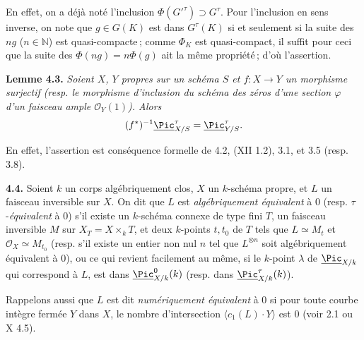 En
effet, on a d\'ej\`a not\'e l'inclusion \(\Phi(G'^\tau)\supset G^\tau\). Pour l'inclusion en sens inverse, on note que \(g\in G(K)\) est dans \(G^\tau(K)\) si et seulement si la suite des \(ng\) (\(n\in\mathbb N\)) est quasi-compacte\,; comme \(\Phi_K\) est quasi-compact, il suffit pour ceci que la suite des \(\Phi(ng)=n\Phi(g)\) ait la m\^eme propri\'et\'e\,; d'o\`u l'assertion.

\textbf{Lemme 4.3.} \emph{Soient \(X\), \(Y\) propres sur un sch\'ema \(S\) et \(f:X\to Y\) un morphisme surjectif (resp. le morphisme d'inclusion du sch\'ema des z\'eros d'une section \(\varphi\) d'un faisceau ample \(\mathcal O_Y(1)\)). Alors}
\[
  (f^*)^{-1}\underline{\Pic}^\tau_{X/S}=\underline{\Pic}^\tau_{Y/S}.
\]

En effet, l'assertion est cons\'equence formelle de 4.2, (XII 1.2), 3.1, et 3.5 (resp. 3.8).

\textbf{4.4.} Soient \(k\) un corps alg\'ebriquement clos, \(X\) un \(k\)-sch\'ema propre, et \(L\) un faisceau inversible sur \(X\). On dit que \(L\) est \emph{alg\'ebriquement \'equivalent} \`a \(0\) (resp. \(\tau\)-\emph{\'equivalent} \`a \(0\)) s'il existe un \(k\)-sch\'ema connexe de type fini \(T\), un faisceau inversible \(M\) sur \(X_T=X\times_k T\), et deux \(k\)-points \(t,t_0\) de \(T\) tels que \(L\simeq M_t\) et \(\mathcal O_X\simeq M_{t_0}\) (resp. s'il existe un entier non nul \(n\) tel que \(L^{\otimes n}\) soit alg\'ebriquement \'equivalent \`a \(0\)), ou ce qui revient facilement au m\^eme, si le \(k\)-point \(\lambda\) de \(\underline{\Pic}_{X/k}\) qui correspond \`a \(L\), est dans \(\underline{\Pic}^0_{X/k}(k)\) (resp. dans \(\underline{\Pic}^\tau_{X/k}(k)\)).

Rappelons aussi que \(L\) est dit \emph{num\'eriquement \'equivalent} \`a \(0\) si pour toute courbe int\`egre ferm\'ee \(Y\) dans \(X\), le nombre d'intersection \(\langle c_1(L)\cdot Y\rangle\) est \(0\) (voir 2.1 ou X 4.5).

